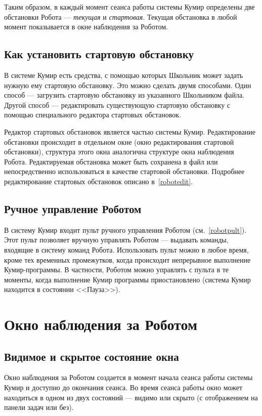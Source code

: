 \documentclass[12pt,a4paper]{article}
\begin{document}
Таким образом, в каждый момент сеанса работы системы Кумир определены две обстановки Робота --- \emph{текущая} и \emph{стартовая}. Текущая обстановка в любой момент показывается в окне наблюдения за Роботом.

\subsection{Как установить стартовую обстановку}

В системе Кумир есть средства, с помощью которых Школьник может задать нужную ему стартовую обстановку. Это можно сделать двумя способами. Один способ --- загрузить стартовую обстановку из указанного Школьником файла. Другой способ --- редактировать существующую стартовую обстановку с помощью специального редактора стартовых обстановок.

Редактор стартовых обстановок является частью системы Кумир. Редактирование обстановки происходит в отдельном окне (окно редактирования стартовой обстановки), структура этого окна аналогична структуре окна наблюдения Робота. Редактируемая обстановка может быть сохранена в файл или непосредственно использоваться в качестве стартовой обстановки. Подробнее редактирование стартовых обстановок описано в~\ref{robotedit}.

\subsection{Ручное управление Роботом}

В систему Кумир входит пульт ручного управления Роботом (см.~\ref{robotpult}). Этот пульт позволяет вручную управлять Роботом --- выдавать команды, входящие в систему команд Робота. Использовать пульт можно в любое время, кроме тех временных промежутков, когда происходит непрерывное выполнение Кумир-программы. В частности, Роботом можно управлять с пульта в те моменты, когда выполнение Кумир программы приостановлено (система Кумир находится в состоянии <<Пауза>>).

\section{Окно наблюдения за Роботом}
\label{robotwindow}

\subsection{Видимое и скрытое состояние окна}

Окно наблюдения за Роботом создается в момент начала сеанса работы системы Кумир и доступно до окончания сеанса. Во время сеанса работы окно может находиться в одном из двух состояний --- видимо или скрыто (с отображением на панели задач или без).
\end{document}
